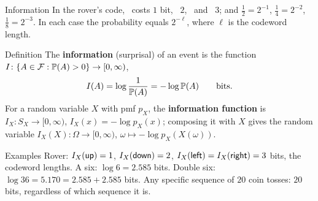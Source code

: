 \begin{frame}{Information}
  \small
  In the rover's code, \up\ costs $1$ bit, \down\ $2$, \lft\ and \rgt\ $3$; and $\tfrac12=2^{-1}$, $\tfrac14=2^{-2}$, $\tfrac18=2^{-3}$. In each case the probability equals $2^{-\ell}$, where $\ell$ is the codeword length.
  \begin{block}{Definition}
    The \textbf{information} (surprisal) of an event is the function $I\colon\{A\in\mathcal{F}:\mathbb{P}(A)>0\}\to[0,\infty)$,
    \[
      I(A)=\log\frac1{\mathbb{P}(A)}=-\log\mathbb{P}(A)\qquad\text{bits.}
    \]
    For a random variable $X$ with pmf $p_X$, the \textbf{information function} is $I_X\colon S_X\to[0,\infty)$, $I_X(x)=-\log p_X(x)$; composing it with $X$ gives the random variable $I_X(X)\colon\Omega\to[0,\infty)$, $\omega\mapsto-\log p_X(X(\omega))$.
  \end{block}
  \begin{exampleblock}{Examples}
    Rover: $I_X(\textsf{up})=1$, $I_X(\textsf{down})=2$, $I_X(\textsf{left})=I_X(\textsf{right})=3$ bits, the codeword lengths. \quad
    A six: $\log6=2.585$ bits. \quad Double six: $\log36=5.170=2.585+2.585$ bits. \quad Any specific sequence of $20$ coin tosses: $20$ bits, regardless of which sequence it is.
  \end{exampleblock}
\end{frame}

